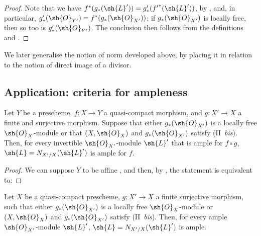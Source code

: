 \begin{proof}
Note that we have $f^*(g_*(\sh{L}'))=g'_*({f'}^*(\sh{L}'))$, by , and, in particular, $g'_*(\sh{O}_{Y'})=f^*(g_*(\sh{O}_{X'}))$;
if $g_*(\sh{O}_{X'})$ is locally free, then so too is $g'_*(\sh{O}_{Y'})$.
The conclusion then follows from the definitions and .
\end{proof}

\begin{remark}[6.5.9]
\label{II.6.5.9}
We later generalise the notion of norm developed above, by placing it in relation to the notion of direct image of a divisor.
\end{remark}


\subsection{Application: criteria for ampleness}
\label{subsection:II.6.6}

\begin{proposition}[6.6.1]
\label{II.6.6.1}
Let $Y$ be a prescheme, $f:X\to Y$ a quasi-compact morphism, and $g:X'\to X$ a finite and surjective morphism.
Suppose that either $g_*(\sh{O}_{X'})$ is a locally free $\sh{O}_X$-module or that $(X,\sh{O}_X)$ and $g_*(\sh{O}_{X'})$ satisfy (II~\emph{bis}).
Then, for every invertible $\sh{O}_{X'}$-module $\sh{L}'$ that is ample for $f\circ g$, $\sh{L}=N_{X'/X}(\sh{L}')$ is ample for $f$.
\end{proposition}

\begin{proof}
We can suppose $Y$ to be affine , and then, by , the statement is equivalent to:
\end{proof}

\begin{corollary}[6.6.2]
\label{II.6.6.2}
Let $X$ be a quasi-compact prescheme, $g:X'\to X$ a finite surjective morphism, such that either $g_*(\sh{O}_{X'})$ is a locally free $\sh{O}_X$-module or $(X,\sh{O}_X)$ and $g_*(\sh{O}_{X'})$ satisfy (II~\emph{bis}).
Then, for every ample $\sh{O}_{X'}$-module $\sh{L}'$, $\sh{L}=N_{X'/X}(\sh{L}')$ is ample.
\end{corollary}

